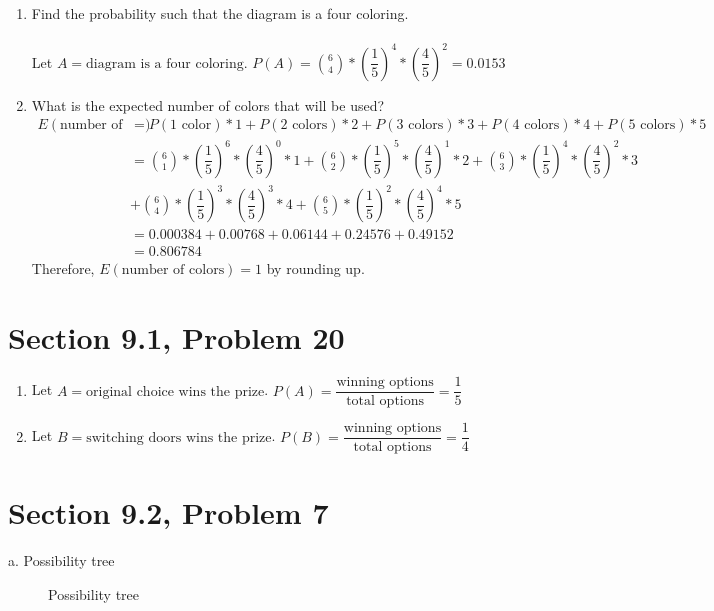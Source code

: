 \documentclass{article}
\author{Nathan Stouffer}
\begin{document}
	
\begin{enumerate}[1.1]
	\item Find the probability such that the diagram is a four coloring. \\\\
		Let $A=\text{diagram is a four coloring}$. $P(A)=\binom{6}{4} *(\dfrac{1}{5})^4*(\dfrac{4}{5})^2=0.0153$
	\item What is the expected number of colors that will be used?
		\begin{align*}
			E(\text{number of colors})&= P(\text{1 color})*1 + P(\text{2 colors})*2 + P(\text{3 colors})*3 + P(\text{4 colors})*4 + P(\text{5 colors})*5 \\
			&= \binom{6}{1} * (\dfrac{1}{5})^6 * (\dfrac{4}{5})^0 * 1 
			+ \binom{6}{2} * (\dfrac{1}{5})^5 * (\dfrac{4}{5})^1 * 2
			+ \binom{6}{3} * (\dfrac{1}{5})^4 * (\dfrac{4}{5})^2 * 3  \\
			&+ \binom{6}{4} * (\dfrac{1}{5})^3 * (\dfrac{4}{5})^3 * 4
			+ \binom{6}{5} * (\dfrac{1}{5})^2 * (\dfrac{4}{5})^4 * 5 \\
			&= 0.000384 + 0.00768 + 0.06144 + 0.24576 + 0.49152 \\
			&= 0.806784
		\end{align*}
		Therefore, $E(\text{number of colors}) = 1$ by rounding up.
\end{enumerate}

\clearpage
\header

\section*{Section 9.1, Problem 20}

\begin{enumerate}
	\item Let $A=\text{original choice wins the prize}$. $P(A)=\dfrac{\text{winning options}}{\text{total options}}=\dfrac{1}{5}$
	\item Let $B=\text{switching doors wins the prize}$. $P(B)=\dfrac{\text{winning options}}{\text{total options}}=\dfrac{1}{4}$
\end{enumerate}

\clearpage
\header

\section*{Section 9.2, Problem 7}
a. Possibility tree
\graphicspath{ {possibility_tree} }
\begin{figure}[h]
	\centering
	\caption{Possibility tree}
\end{figure}
\end{document}
